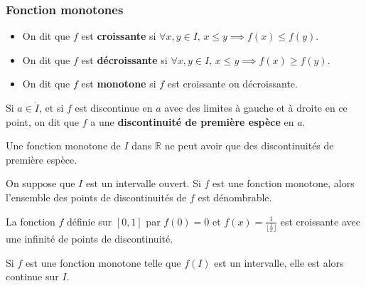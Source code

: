   \subsubsection{Fonction monotones}


  \begin{definition}
    \begin{itemize}
      \item On dit que $f$ est \textbf{croissante} si $\forall x, y \in I, \, x \leq y \implies f(x) \leq f(y)$.
      \item On dit que $f$ est \textbf{décroissante} si $\forall x, y \in I, \, x \leq y \implies f(x) \geq f(y)$.
      \item On dit que $f$ est \textbf{monotone} si $f$ est croissante ou décroissante.
    \end{itemize}
  \end{definition}


  \begin{definition}
    Si $a \in \mathring{I}$, et si $f$ est discontinue en $a$ avec des limites à gauche et à droite en ce point, on dit que $f$ a une \textbf{discontinuité de première espèce} en $a$.
  \end{definition}

  \begin{proposition}
    Une fonction monotone de $I$ dans $\mathbb{R}$ ne peut avoir que des discontinuités de première espèce.
  \end{proposition}

  \begin{theorem}
    On suppose que $I$ est un intervalle ouvert. Si $f$ est une fonction monotone, alors l'ensemble des points de discontinuités de $f$ est dénombrable.
  \end{theorem}

  \begin{example}
    La fonction $f$ définie sur $[0,1]$ par $f(0) = 0$ et $f(x) = \frac{1}{\lfloor \frac{1}{x} \rfloor}$ est croissante avec une infinité de points de discontinuité.
  \end{example}


  \begin{proposition}
    Si $f$ est une fonction monotone telle que $f(I)$ est un intervalle, elle est alors continue sur $I$.
  \end{proposition}

